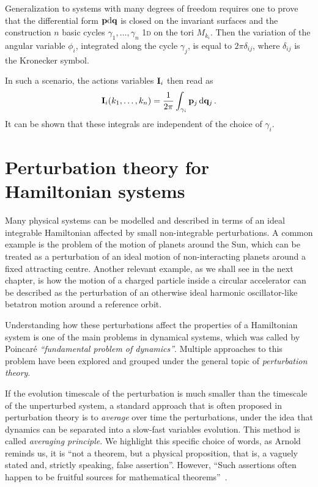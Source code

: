 Generalization to systems with many degrees of freedom requires one to prove that the differential form $\vb{p}\dd \vb{q}$ is closed on the invariant surfaces and the construction $n$ basic cycles $\gamma_1,\dots, \gamma_n$ 1\textsc{d} on the tori $M_{k_i}$. Then the variation of the angular variable $\phi_i$, integrated along the cycle $\gamma_j$, is equal to $2\pi\delta_{ij}$, where $\delta_{ij}$ is the Kronecker symbol.

In such a scenario, the actions variables $\vb{I}_i$ then read as
%
\begin{equation}
    \vb{I}_i(k_1,\dots,k_n) = \frac{1}{2\pi}\int_{\gamma_i} \vb{p}_j\, \dd \vb{q}_j\, .  
\end{equation} 
%
It can be shown that these integrals are independent of the choice of $\gamma_i$.~\cite{Arnold:937549}

\section{Perturbation theory for Hamiltonian systems}\label{sec:1:averaging}

Many physical systems can be modelled and described in terms of an ideal integrable Hamiltonian affected by small non-integrable perturbations. A common example is the problem of the motion of planets around the Sun, which can be treated as a perturbation of an ideal motion of non-interacting planets around a fixed attracting centre. Another relevant example, as we shall see in the next chapter, is how the motion of a charged particle inside a circular accelerator can be described as the perturbation of an otherwise ideal harmonic oscillator-like betatron motion around a reference orbit.

Understanding how these perturbations affect the properties of a Hamiltonian system is one of the main problems in dynamical systems, which was called by Poincaré \textit{``fundamental problem of dynamics''}. Multiple approaches to this problem have been explored and grouped under the general topic of \textit{perturbation theory}.

If the evolution timescale of the perturbation is much smaller than the timescale of the unperturbed system, a standard approach that is often proposed in perturbation theory is to \textit{average} over time the perturbations, under the idea that dynamics can be separated into a slow-fast variables evolution. This method is called \textit{averaging principle}. We highlight this specific choice of words, as Arnold reminds us, it is ``not a theorem, but a physical proposition, that is, a vaguely stated and, strictly speaking, false assertion''. However, ``Such assertions often happen to be fruitful sources for mathematical theorems''~\cite{Arnold:937549}.

